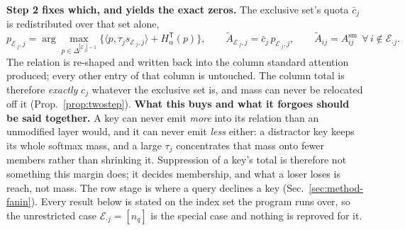 \documentclass{article}
\newcommand{\simplex}{\Delta}
\newcommand{\Tent}{H^{\mathsf{T}}}
\begin{document}
\textbf{Step 2 fixes which, and yields the exact zeros.} The exclusive set's quota $\bar c_j$ is
redistributed over that set alone,
\begin{equation}
p_{\mathcal{E}_{\cdot j},j} = \arg\max_{p \in \simplex^{|\mathcal{E}_{\cdot j}|-1}}\big\{\langle p, \tau_j s_{\mathcal{E}_{\cdot j},j}\rangle + \Tent_\alpha(p)\big\},
\qquad
\tilde A_{\mathcal{E}_{\cdot j},j} = \bar c_j\, p_{\mathcal{E}_{\cdot j},j},
\qquad
\tilde A_{ij} = A^{\mathrm{sm}}_{ij}\ \ \forall\, i\notin\mathcal{E}_{\cdot j}.
\label{eq:program}
\end{equation}
The relation is re-shaped and written back into the column standard attention produced; every
other entry of that column is untouched. The column total is therefore
\emph{exactly} $c_j$ whatever the exclusive set is, and mass can never be relocated off it
(Prop.~\ref{prop:twostep}). \textbf{What this buys and what it forgoes should be said together.}
A key can never emit \emph{more} into its relation than an unmodified layer would, and it can
never emit \emph{less} either: a distractor key keeps its whole softmax mass, and a large
$\tau_j$ concentrates that mass onto fewer members rather than shrinking it. Suppression of a
key's total is therefore not something this margin does; it decides membership, and what a
loser loses is reach, not mass. The row stage is where a query declines a key
(Sec.~\ref{sec:method-fanin}). Every result below is stated on the index set the program runs over,
so the unrestricted case $\mathcal{E}_{\cdot j}=[n_q]$ is the special case and nothing is
reproved for it.
\end{document}
